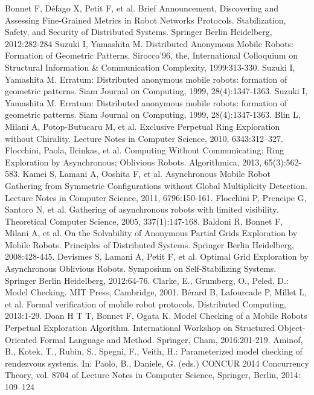 \begin{thebibliography}{0}
   Bonnet F, Défago X, Petit F, et al. Brief Announcement, Discovering and Assessing Fine-Grained Metrics in Robot Networks Protocols. Stabilization, Safety, and Security of Distributed Systems. Springer Berlin Heidelberg, 2012:282-284
   Suzuki I, Yamashita M. Distributed Anonymous Mobile Robots: Formation of Geometric Patterns. Sirocco'96, the, International Colloquium on Structural Information & Communication Complexity, 1999:313-330.
   Suzuki I, Yamashita M. Erratum: Distributed anonymous mobile robots: formation of geometric patterns. Siam Journal on Computing, 1999, 28(4):1347-1363.
   Suzuki I, Yamashita M. Erratum: Distributed anonymous mobile robots: formation of geometric patterns. Siam Journal on Computing, 1999, 28(4):1347-1363.
   Blin L, Milani A, Potop-Butucaru M, et al. Exclusive Perpetual Ring Exploration without Chirality. Lecture Notes in Computer Science, 2010, 6343:312--327.
   Flocchini, Paola, Ilcinkas, et al. Computing Without Communicating: Ring Exploration by Asynchronous; Oblivious Robots. Algorithmica, 2013, 65(3):562-583.
   Kamei S, Lamani A, Ooshita F, et al. Asynchronous Mobile Robot Gathering from Symmetric Configurations without Global Multiplicity Detection. Lecture Notes in Computer Science, 2011, 6796:150-161.
   Flocchini P, Prencipe G, Santoro N, et al. Gathering of asynchronous robots with limited visibility. Theoretical Computer Science, 2005, 337(1):147-168.
   Baldoni R, Bonnet F, Milani A, et al. On the Solvability of Anonymous Partial Grids Exploration by Mobile Robots. Principles of Distributed Systems. Springer Berlin Heidelberg, 2008:428-445.
   Devismes S, Lamani A, Petit F, et al. Optimal Grid Exploration by Asynchronous Oblivious Robots. Symposium on Self-Stabilizing Systems. Springer Berlin Heidelberg, 2012:64-76.
   Clarke, E., Grumberg, O., Peled, D.: Model Checking. MIT Press, Cambridge, 2001.
   Bérard B, Lafourcade P, Millet L, et al. Formal verification of mobile robot protocols. Distributed Computing, 2013:1-29.
   Doan H T T, Bonnet F, Ogata K. Model Checking of a Mobile Robots Perpetual Exploration Algorithm. International Workshop on Structured Object-Oriented Formal Language and Method. Springer, Cham, 2016:201-219.
   Aminof, B., Kotek, T., Rubin, S., Spegni, F., Veith, H.: Parameterized model checking of rendezvous systems. In: Paolo, B., Daniele, G. (eds.) CONCUR 2014 Concurrency Theory, vol. 8704 of Lecture Notes in Computer Science, Springer, Berlin, 2014: 109–124

\end{thebibliography}
